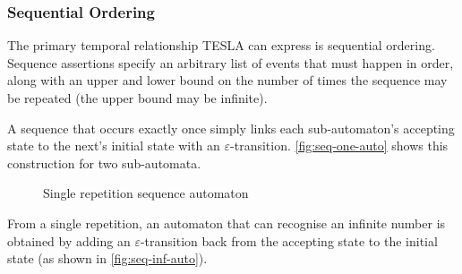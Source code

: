 \subsubsection{Sequential Ordering}

The primary temporal relationship TESLA can express is sequential
ordering. Sequence assertions specify an arbitrary list of events that
must happen in order, along with an upper and lower bound on the number
of times the sequence may be repeated (the upper bound may be infinite).

A sequence that occurs exactly once simply links each sub-automaton's
accepting state to the next's initial state with an
$\varepsilon$-transition.  \autoref{fig:seq-one-auto} shows this
construction for two sub-automata.

\begin{figure}
  \centering
  \caption{Single repetition sequence automaton}
  \label{fig:seq-one-auto}
\end{figure}

From a single repetition, an automaton that can recognise an infinite
number is obtained by adding an $\varepsilon$-transition back from the
accepting state to the initial state (as shown in
\autoref{fig:seq-inf-auto}).

